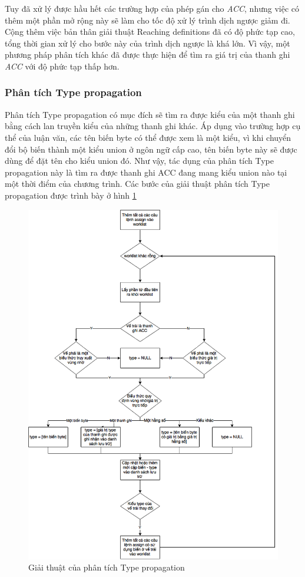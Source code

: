 Tuy đã xử lý được hầu hết các trường hợp của phép gán cho \textit{ACC}, nhưng việc có thêm một phần mở rộng này sẽ làm cho tốc độ xử lý trình dịch ngược giảm đi. Cộng thêm việc bản thân giải thuật Reaching definitions đã có độ phức tạp cao, tổng thời gian xử lý cho bước này của trình dịch ngược là khá lớn. Vì vậy, một phương pháp phân tích khác đã được thực hiện để tìm ra giá trị của thanh ghi \textit{ACC} với độ phức tạp thấp hơn.

\subsubsection{Phân tích Type propagation}
Phân tích Type propagation có mục đích sẽ tìm ra được kiểu của một thanh ghi bằng cách lan truyền kiểu của những thanh ghi khác. Áp dụng vào trường hợp cụ thể của luận văn, các tên biến byte có thể được xem là một kiểu, vì khi chuyển đổi bộ biến thành một kiểu union ở ngôn ngữ cấp cao, tên biến byte này sẽ được dùng để đặt tên cho kiểu union đó. Như vậy, tác dụng của phân tích Type propagation này là tìm ra được thanh ghi ACC đang mang kiểu union nào tại một thời điểm của chương trình. Các bước của giải thuật phân tích Type propagation được trình bày ở hình \ref{fig:typepropagationalgo}

\begin{figure}
	\centering
	\includegraphics[width=0.7\linewidth]{image/typePropagationAlgo}
	\caption{Giải thuật của phân tích Type propagation}
	\label{fig:typepropagationalgo}
\end{figure}


